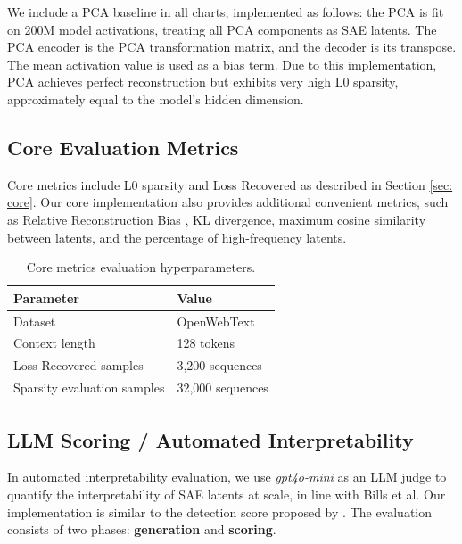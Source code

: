 \documentclass{article}
\theoremstyle{plain}
\theoremstyle{definition}
\theoremstyle{remark}
\begin{document}
We include a PCA baseline in all charts, implemented as follows: the PCA is fit on 200M model activations, treating all PCA components as SAE latents. The PCA encoder is the PCA transformation matrix, and the decoder is its transpose. The mean activation value is used as a bias term. Due to this implementation, PCA achieves perfect reconstruction but exhibits very high L0 sparsity, approximately equal to the model's hidden dimension.

\subsection*{Core Evaluation Metrics}

Core metrics include L0 sparsity and Loss Recovered as described in Section \ref{sec: core}. Our core implementation also provides additional convenient metrics, such as Relative Reconstruction Bias \citet{rajamanoharan2024improving}, KL divergence, maximum cosine similarity between latents, and the percentage of high-frequency latents.


\begin{table}[h!]
    \centering
    \begin{tabular}{|l|l|}
        \hline
        \textbf{Parameter}             & \textbf{Value}                  \\ \hline
        Dataset                        & OpenWebText                     \\ \hline
        Context length                 & 128 tokens                      \\ \hline
        Loss Recovered samples         & 3,200 sequences                 \\ \hline
        Sparsity evaluation samples    & 32,000 sequences                \\ \hline
    \end{tabular}
    \caption{Core metrics evaluation hyperparameters.}
    \label{tab:core-metrics-parameters}
\end{table}


\subsection*{LLM Scoring / Automated Interpretability}

In automated interpretability evaluation, we use \textit{gpt4o-mini} as an LLM judge to quantify the interpretability of SAE latents at scale, in line with Bills et al. Our implementation is similar to the detection score proposed by \citet{paulo2024automaticallyinterpretingmillionsfeatures}. The evaluation consists of two phases: \textbf{generation} and \textbf{scoring}.
\end{document}
